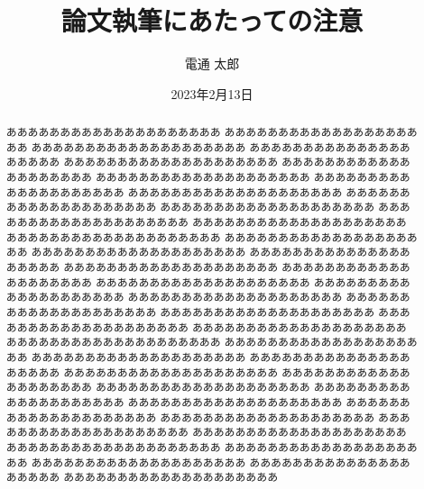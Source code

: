 \documentclass[11pt,master]{oecu-thesis}
\title{論文執筆にあたっての注意}
\author{電通 太郎}
\date{2023年2月13日}
\begin{document}
\maketitle
{}


\begin{abstract}

\begin{multicols}{2}
\small
\setlength{\parindent}{1zw}
\begin{spacing}{1.0}
ああああああああああああああああああああ
ああああああああああああああああああああ
ああああああああああああああああああああ
ああああああああああああああああああああ
ああああああああああああああああああああ
ああああああああああああああああああああ
ああああああああああああああああああああ
ああああああああああああああああああああ
ああああああああああああああああああああ
ああああああああああああああああああああ
ああああああああああああああああああああ
ああああああああああああああああああああ
ああああああああああああああああああああ
ああああああああああああああああああああ
ああああああああああああああああああああ
ああああああああああああああああああああ
ああああああああああああああああああああ
ああああああああああああああああああああ
ああああああああああああああああああああ
ああああああああああああああああああああ
ああああああああああああああああああああ
ああああああああああああああああああああ
ああああああああああああああああああああ
ああああああああああああああああああああ
ああああああああああああああああああああ
ああああああああああああああああああああ
ああああああああああああああああああああ
ああああああああああああああああああああ
ああああああああああああああああああああ
ああああああああああああああああああああ
ああああああああああああああああああああ
ああああああああああああああああああああ
ああああああああああああああああああああ
ああああああああああああああああああああ
ああああああああああああああああああああ
ああああああああああああああああああああ
ああああああああああああああああああああ
ああああああああああああああああああああ
ああああああああああああああああああああ
ああああああああああああああああああああ
ああああああああああああああああああああ
ああああああああああああああああああああ
ああああああああああああああああああああ
ああああああああああああああああああああ

\end{spacing}
\end{multicols}
\end{abstract}
\end{document}

